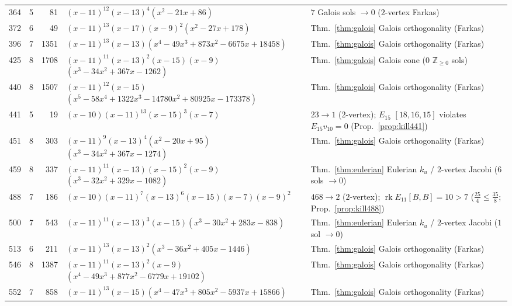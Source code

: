 \documentclass[11pt,reqno]{amsart}
\theoremstyle{definition}
\theoremstyle{remark}
\numberwithin{equation}{section}
\numberwithin{table}{section}
\DeclareMathOperator{\rk}{rk}
\begin{document}
{\begin{longtable}{@{}rrr>{\raggedright\arraybackslash}p{2.45in}>{\raggedright\arraybackslash}p{2.35in}@{}}
364 & 5 & 81 & $(x-11)^{12}$\allowbreak $(x-13)^4$\allowbreak $(x^2-21x+86)$ & $7$ Galois sols $\to 0$ ($2$-vertex Farkas) \\
372 & 6 & 49 & $(x-11)^{13}$\allowbreak $(x-17)$\allowbreak $(x-9)^2$\allowbreak $(x^2-27x+178)$ & Thm.~\ref{thm:galois} Galois orthogonality (Farkas) \\
396 & 7 & 1351 & $(x-11)^{13}$\allowbreak $(x-13)$\allowbreak $(x^4-49x^3+873x^2-6675x+18458)$ & Thm.~\ref{thm:galois} Galois orthogonality (Farkas) \\
425 & 8 & 1708 & $(x-11)^{11}$\allowbreak $(x-13)^2$\allowbreak $(x-15)$\allowbreak $(x-9)$\allowbreak $(x^3-34x^2+367x-1262)$ & Thm.~\ref{thm:galois} Galois cone ($0$ $\mathbb{Z}_{\ge 0}$ sols) \\
440 & 8 & 1507 & $(x-11)^{12}$\allowbreak $(x-15)$\allowbreak $(x^5-58x^4+1322x^3-14780x^2+80925x-173378)$ & Thm.~\ref{thm:galois} Galois orthogonality (Farkas) \\
441 & 5 & 19 & $(x-10)$\allowbreak $(x-11)^{13}$\allowbreak $(x-15)^3$\allowbreak $(x-7)$ & $23\to 1$ ($2$-vertex); $E_{15}$ $[18,16,15]$ violates $E_{15}v_{10}=0$ (Prop.~\ref{prop:kill441}) \\
451 & 8 & 303 & $(x-11)^9$\allowbreak $(x-13)^4$\allowbreak $(x^2-20x+95)$\allowbreak $(x^3-34x^2+367x-1274)$ & Thm.~\ref{thm:galois} Galois orthogonality (Farkas) \\
459 & 8 & 337 & $(x-11)^{11}$\allowbreak $(x-13)$\allowbreak $(x-15)^2$\allowbreak $(x-9)$\allowbreak $(x^3-32x^2+329x-1082)$ & Thm.~\ref{thm:eulerian} Eulerian $k_u$ / $2$-vertex Jacobi ($6$ sols $\to 0$) \\
488 & 7 & 186 & $(x-10)$\allowbreak $(x-11)^7$\allowbreak $(x-13)^6$\allowbreak $(x-15)$\allowbreak $(x-7)$\allowbreak $(x-9)^2$ & $468\to 2$ ($2$-vertex); $\rk E_{11}[B,B]=10 > 7$ ($\frac{25}{4}\le\frac{35}{8}$; Prop.~\ref{prop:kill488}) \\
500 & 7 & 543 & $(x-11)^{11}$\allowbreak $(x-13)^3$\allowbreak $(x-15)$\allowbreak $(x^3-30x^2+283x-838)$ & Thm.~\ref{thm:eulerian} Eulerian $k_u$ / $2$-vertex Jacobi ($1$ sol $\to 0$) \\
513 & 6 & 211 & $(x-11)^{13}$\allowbreak $(x-13)^2$\allowbreak $(x^3-36x^2+405x-1446)$ & Thm.~\ref{thm:galois} Galois orthogonality (Farkas) \\
546 & 8 & 1387 & $(x-11)^{11}$\allowbreak $(x-13)^2$\allowbreak $(x-9)$\allowbreak $(x^4-49x^3+877x^2-6779x+19102)$ & Thm.~\ref{thm:galois} Galois orthogonality (Farkas) \\
552 & 7 & 858 & $(x-11)^{13}$\allowbreak $(x-15)$\allowbreak $(x^4-47x^3+805x^2-5937x+15866)$ & Thm.~\ref{thm:galois} Galois orthogonality (Farkas) \\

\end{longtable}}
\end{document}
